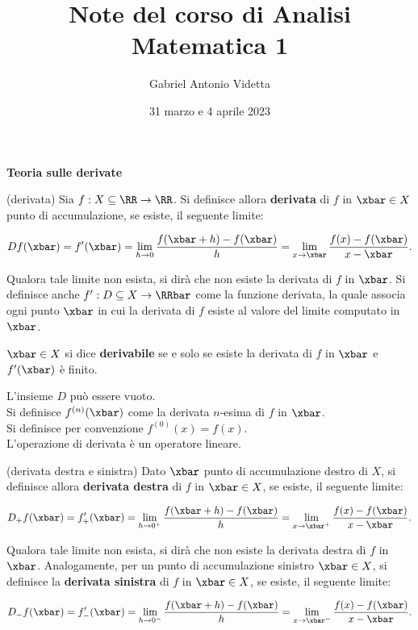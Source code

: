 \documentclass[11pt]{article}
\title{\textbf{Note del corso di Analisi Matematica 1}}
\author{Gabriel Antonio Videtta}
\date{31 marzo e 4 aprile 2023}
\begin{document}
	
	\maketitle
	
	\begin{center}
		\Large \textbf{Teoria sulle derivate}
	\end{center}

	\begin{definition} (derivata)
		Sia $f : X \subseteq \RR \to \RR$. Si definisce allora \textbf{derivata}
		di $f$ in $\xbar \in X$ punto di accumulazione, se esiste, il seguente limite:
		
		\[Df(\xbar) = f'(\xbar) = \lim_{h \to 0} \frac{f(\xbar + h) - f(\xbar)}{h} = \lim_{x \to \xbar} \frac{f(x) - f(\xbar)}{x - \xbar}.\]
		
		\vskip 0.05in
		
		Qualora tale limite non esista, si dirà che non esiste la derivata
		di $f$ in $\xbar$. Si definisce anche $f' : D \subseteq X \to \RRbar$ come la funzione derivata,
		la quale associa ogni punto $\xbar$ in cui la derivata di $f$ esiste al
		valore del limite computato in $\xbar$.
	\end{definition}
	
	\begin{definition}
		$\xbar \in X$ si dice \textbf{derivabile} se e solo se esiste la
		derivata di $f$ in $\xbar$ e $f'(\xbar)$ è finito.
	\end{definition}
	
	\begin{remark}\nl
		\li L'insieme $D$ può essere vuoto. \\
		\li Si definisce $f^{(n)}(\xbar)$ come la derivata $n$-esima
		di $f$ in $\xbar$. \\
		\li Si definisce per convenzione $f^{(0)}(x) = f(x)$. \\
		\li L'operazione di derivata è un operatore lineare. \\
	\end{remark}

	\begin{definition} (derivata destra e sinistra)
		Dato $\xbar$ punto di accumulazione destro di $X$, si definisce
		allora \textbf{derivata destra} di $f$ in $\xbar \in X$, se
		esiste, il seguente limite:
		
		\[D_+ f(\xbar) = f_+'(\xbar) = \lim_{h \to 0^+} \frac{f(\xbar + h) - f(\xbar)}{h} = \lim_{x \to \xbar^+} \frac{f(x) - f(\xbar)}{x - \xbar}.\]
		
		\vskip 0.05in
		
		Qualora tale limite non esista, si dirà che non esiste la derivata destra di $f$ in $\xbar$. Analogamente, per un punto di accumulazione sinistro $\xbar \in X$, si definisce
		la \textbf{derivata sinistra} di $f$ in $\xbar \in X$, se esiste, il seguente
		limite:
		
		\[D_- f(\xbar) = f_-'(\xbar) = \lim_{h \to 0^-} \frac{f(\xbar + h) - f(\xbar)}{h} = \lim_{x \to \xbar^-} \frac{f(x) - f(\xbar)}{x - \xbar}.\]
	\end{definition}
\end{document}

